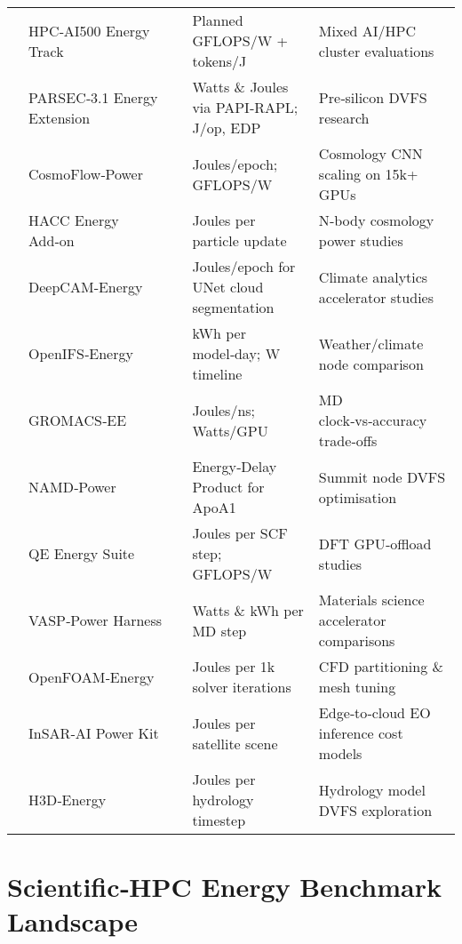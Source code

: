 \begin{table*}[!t]
\begin{tabularx}{0.9\textwidth}{|p{}p{}p{}XX|}
   & HPC‑AI500 Energy Track  & \cite{hpcai500energyt}  & Planned GFLOPS/W + tokens/J & Mixed AI/HPC cluster evaluations \\  
   & PARSEC‑3.1 Energy Extension  & \cite{parsec31energye} & Watts \& Joules via PAPI‑RAPL; J/op, EDP & Pre‑silicon DVFS research \\  
   & CosmoFlow‑Power  & \cite{cosmoflow2019}           & Joules/epoch; GFLOPS/W & Cosmology CNN scaling on 15k+ GPUs \\  
   & HACC Energy Add‑on  & \cite{hacc2020power}        & Joules per particle update & N‑body cosmology power studies \\  
   & DeepCAM‑Energy  & \cite{deepcam2020power}         & Joules/epoch for UNet cloud segmentation & Climate analytics accelerator studies \\  
   & OpenIFS‑Energy  & \cite{openifsenergy2023}        & kWh per model‑day; W timeline & Weather/climate node comparison \\  
   & GROMACS‑EE  & \cite{gromacsee2024}                & Joules/ns; Watts/GPU & MD clock‑vs‑accuracy trade‑offs \\  
   & NAMD‑Power  & \cite{namdpower2019}                & Energy‑Delay Product for ApoA1 & Summit node DVFS optimisation \\  
   & QE Energy Suite  & \cite{qeenergy2022}            & Joules per SCF step; GFLOPS/W & DFT GPU‑offload studies \\  
   & VASP‑Power Harness  & \cite{vasppower2023}        & Watts \& kWh per MD step & Materials science accelerator comparisons \\  
   & OpenFOAM‑Energy  & \cite{openfoamenergy2021}      & Joules per 1k solver iterations & CFD partitioning \& mesh tuning \\  
   & InSAR‑AI Power Kit  & \cite{insarpower2024}       & Joules per satellite scene & Edge‑to‑cloud EO inference cost models \\  
   & H3D‑Energy  & \cite{h3denergy2023}                & Joules per hydrology timestep & Hydrology model DVFS exploration \\ \bottomrule
  \end{tabularx}
\end{table*}


\section{Scientific‑HPC Energy Benchmark Landscape}
\label{sec:landscape}

